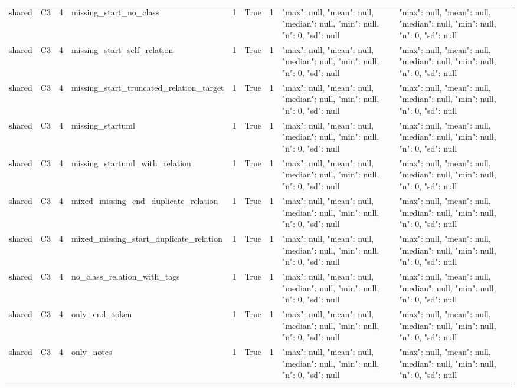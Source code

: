 \begin{tabular}{lllllllll}
shared & C3 & 4 & missing\_start\_no\_class & 1 & True & 1 & {"max": null, "mean": null, "median": null, "min": null, "n": 0, "sd": null} & {"max": null, "mean": null, "median": null, "min": null, "n": 0, "sd": null} \\
shared & C3 & 4 & missing\_start\_self\_relation & 1 & True & 1 & {"max": null, "mean": null, "median": null, "min": null, "n": 0, "sd": null} & {"max": null, "mean": null, "median": null, "min": null, "n": 0, "sd": null} \\
shared & C3 & 4 & missing\_start\_truncated\_relation\_target & 1 & True & 1 & {"max": null, "mean": null, "median": null, "min": null, "n": 0, "sd": null} & {"max": null, "mean": null, "median": null, "min": null, "n": 0, "sd": null} \\
shared & C3 & 4 & missing\_startuml & 1 & True & 1 & {"max": null, "mean": null, "median": null, "min": null, "n": 0, "sd": null} & {"max": null, "mean": null, "median": null, "min": null, "n": 0, "sd": null} \\
shared & C3 & 4 & missing\_startuml\_with\_relation & 1 & True & 1 & {"max": null, "mean": null, "median": null, "min": null, "n": 0, "sd": null} & {"max": null, "mean": null, "median": null, "min": null, "n": 0, "sd": null} \\
shared & C3 & 4 & mixed\_missing\_end\_duplicate\_relation & 1 & True & 1 & {"max": null, "mean": null, "median": null, "min": null, "n": 0, "sd": null} & {"max": null, "mean": null, "median": null, "min": null, "n": 0, "sd": null} \\
shared & C3 & 4 & mixed\_missing\_start\_duplicate\_relation & 1 & True & 1 & {"max": null, "mean": null, "median": null, "min": null, "n": 0, "sd": null} & {"max": null, "mean": null, "median": null, "min": null, "n": 0, "sd": null} \\
shared & C3 & 4 & no\_class\_relation\_with\_tags & 1 & True & 1 & {"max": null, "mean": null, "median": null, "min": null, "n": 0, "sd": null} & {"max": null, "mean": null, "median": null, "min": null, "n": 0, "sd": null} \\
shared & C3 & 4 & only\_end\_token & 1 & True & 1 & {"max": null, "mean": null, "median": null, "min": null, "n": 0, "sd": null} & {"max": null, "mean": null, "median": null, "min": null, "n": 0, "sd": null} \\
shared & C3 & 4 & only\_notes & 1 & True & 1 & {"max": null, "mean": null, "median": null, "min": null, "n": 0, "sd": null} & {"max": null, "mean": null, "median": null, "min": null, "n": 0, "sd": null} \\

\end{tabular}
